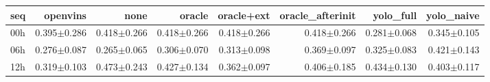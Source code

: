\begin{tabular}{lrrrrrrr}
\toprule
seq & openvins & none & oracle & oracle+ext & oracle\_afterinit & yolo\_full & yolo\_naive \\
\midrule
00h & 0.395$\pm$0.286 & 0.418$\pm$0.266 & 0.418$\pm$0.266 & 0.418$\pm$0.266 & 0.418$\pm$0.266 & 0.281$\pm$0.068 & 0.345$\pm$0.105 \\
06h & 0.276$\pm$0.087 & 0.265$\pm$0.065 & 0.306$\pm$0.070 & 0.313$\pm$0.098 & 0.369$\pm$0.097 & 0.325$\pm$0.083 & 0.421$\pm$0.143 \\
12h & 0.319$\pm$0.103 & 0.473$\pm$0.243 & 0.427$\pm$0.134 & 0.362$\pm$0.097 & 0.406$\pm$0.185 & 0.434$\pm$0.130 & 0.403$\pm$0.117 \\
\bottomrule
\end{tabular}

